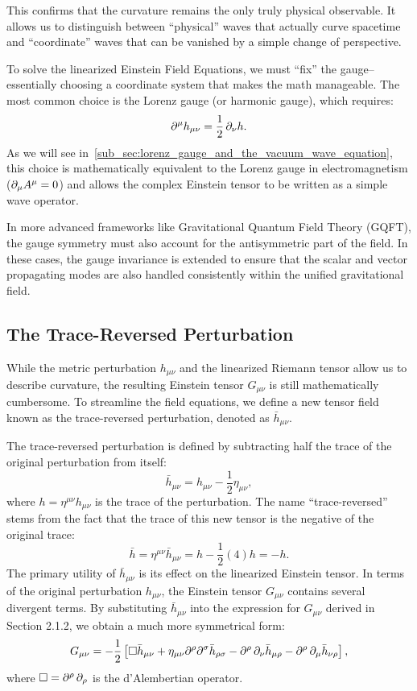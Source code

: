 This confirms that the curvature remains the only truly physical observable. It allows us to distinguish between ``physical'' waves that actually curve spacetime and ``coordinate'' waves that can be vanished by a simple change of perspective.

To solve the linearized Einstein Field Equations, we must ``fix'' the gauge--essentially choosing a coordinate system that makes the math manageable. The most common choice is the Lorenz gauge (or harmonic gauge), which requires:
\[%
  \partial^{\mu}h_{\mu\nu} = \frac{1}{2}\pd{\nu}h
.\]%
As we will see in~\ref{sub_sec:lorenz_gauge_and_the_vacuum_wave_equation}, this choice is mathematically equivalent to the Lorenz gauge in electromagnetism ($\pd{\mu}A^{\mu} = 0$) and allows the complex Einstein tensor to be written as a simple wave operator.

In more advanced frameworks like Gravitational Quantum Field Theory (GQFT), the gauge symmetry must also account for the antisymmetric part of the field. In these cases, the gauge invariance is extended to ensure that the scalar and vector propagating modes are also handled consistently within the unified gravitational field.

\subsection{The Trace-Reversed Perturbation}
\label{sub_sec:the_trace_reversed_perturbation}

While the metric perturbation $h_{\mu\nu}$ and the linearized Riemann tensor allow us to describe curvature, the resulting Einstein tensor $G_{\mu\nu}$ is still mathematically cumbersome. To streamline the field equations, we define a new tensor field known as the trace-reversed perturbation, denoted as $\bar{h}_{\mu\nu}$.

The trace-reversed perturbation is defined by subtracting half the trace of the original perturbation from itself:
\[%
  \bar{h}_{\mu\nu} = h_{\mu\nu} - \frac{1}{2}\eta_{\mu\nu}
,\]%
where $h = \eta^{\mu\nu}h_{\mu\nu}$ is the trace of the perturbation. The name ``trace-reversed'' stems from the fact that the trace of this new tensor is the negative of the original trace:
\[%
  \bar{h} = \eta^{\mu\nu}\bar{h}_{\mu\nu} = h - \frac{1}{2}(4)h = -h
.\]%
The primary utility of $\bar{h}_{\mu\nu}$ is its effect on the linearized Einstein tensor. In terms of the original perturbation $h_{\mu\nu}$, the Einstein tensor $G_{\mu\nu}$ contains several divergent terms. By substituting $\bar{h}_{\mu\nu}$ into the expression for $G_{\mu\nu}$ derived in Section 2.1.2, we obtain a much more symmetrical form:
\[%
  G_{\mu\nu} = -\frac{1}{2} \left[ \Box \bar{h}_{\mu\nu} + \eta_{\mu\nu} \partial^\rho \partial^\sigma \bar{h}_{\rho\sigma} - \partial^\rho \pd{\nu} \bar{h}_{\mu\rho} - \partial^\rho \pd{\mu} \bar{h}_{\nu\rho} \right]
,\]%
where $\Box = \partial^\rho \pd{\rho}$ is the d'Alembertian operator.

